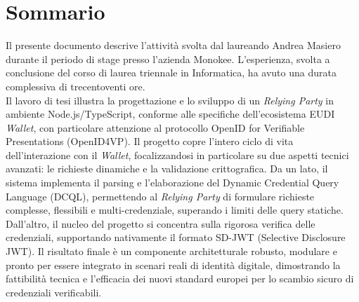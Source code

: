 \cleardoublepage
{}
{}
\begingroup
\let\clearpage\relax
\let\cleardoublepage\relax
\let\cleardoublepage\relax

\chapter*{Sommario}

Il presente documento descrive l'attività svolta dal laureando Andrea Masiero durante il periodo di stage presso l'azienda Monokee. L'esperienza, svolta a conclusione del corso di laurea triennale in Informatica, ha avuto una durata complessiva di trecentoventi ore.\\[0.4cm]
Il lavoro di tesi illustra la progettazione e lo sviluppo di un \textit{Relying Party} in ambiente Node.js/TypeScript, conforme alle specifiche dell'ecosistema EUDI \textit{Wallet}, con particolare attenzione al protocollo OpenID for Verifiable Presentations (OpenID4VP). Il progetto copre l'intero ciclo di vita dell'interazione con il \textit{Wallet}, focalizzandosi in particolare su due aspetti tecnici avanzati: le richieste dinamiche e la validazione crittografica. Da un lato, il sistema implementa il parsing e l'elaborazione del Dynamic Credential Query Language (DCQL), permettendo al \textit{Relying Party} di formulare richieste complesse, flessibili e multi-credenziale, superando i limiti delle query statiche. Dall'altro, il nucleo del progetto si concentra sulla rigorosa verifica delle credenziali, supportando nativamente il formato SD-JWT (Selective Disclosure JWT). Il risultato finale è un componente architetturale robusto, modulare e pronto per essere integrato in scenari reali di identità digitale, dimostrando la fattibilità tecnica e l'efficacia dei nuovi standard europei per lo scambio sicuro di credenziali verificabili.\\[0.4cm]

\endgroup			

\vfill

